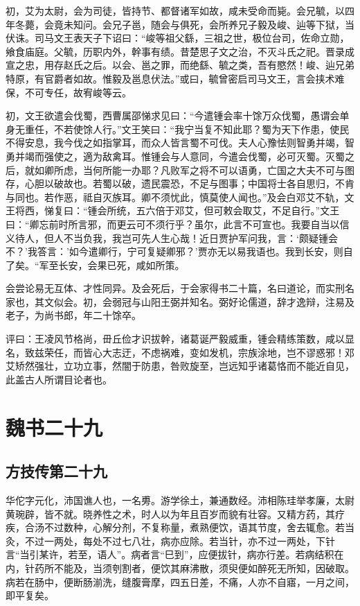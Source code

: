 \documentclass[12pt,UTF8]{ctexbook}
\begin{document}
初，艾为太尉，会为司徒，皆持节、都督诸军如故，咸未受命而毙。会兄毓，以四年冬薨，会竟未知问。会兄子邕，随会与俱死，会所养兄子毅及峻、辿等下狱，当伏诛。司马文王表天子下诏曰：“峻等祖父繇，三祖之世，极位台司，佐命立勋，飨食庙庭。父毓，历职内外，幹事有绩。昔楚思子文之治，不灭斗氏之祀。晋录成宣之忠，用存赵氏之后。以会、邕之罪，而绝繇、毓之类，吾有愍然！峻、辿兄弟特原，有官爵者如故。惟毅及邕息伏法。”或曰，毓曾密启司马文王，言会挟术难保，不可专任，故宥峻等云。

初，文王欲遣会伐蜀，西曹属邵悌求见曰：“今遣锺会率十馀万众伐蜀，愚谓会单身无重任，不若使馀人行。”文王笑曰：“我宁当复不知此耶？蜀为天下作患，使民不得安息，我今伐之如指掌耳，而众人皆言蜀不可伐。夫人心豫怯则智勇并竭，智勇并竭而强使之，適为敌禽耳。惟锺会与人意同，今遣会伐蜀，必可灭蜀。灭蜀之后，就如卿所虑，当何所能一办耶？凡败军之将不可以语勇，亡国之大夫不可与图存，心胆以破故也。若蜀以破，遗民震恐，不足与图事；中国将士各自思归，不肯与同也。若作恶，祗自灭族耳。卿不须忧此，慎莫使人闻也。”及会白邓艾不轨，文王将西，悌复曰：“锺会所统，五六倍于邓艾，但可敕会取艾，不足自行。”文王曰：“卿忘前时所言邪，而更云可不须行乎？虽尔，此言不可宣也。我要自当以信义待人，但人不当负我，我岂可先人生心哉！近日贾护军问我，言：‘颇疑锺会不？’我答言：'如今遣卿行，宁可复疑卿邪？'贾亦无以易我语也。我到长安，则自了矣。“军至长安，会果已死，咸如所策。

会尝论易无互体、才性同异。及会死后，于会家得书二十篇，名曰道论，而实刑名家也，其文似会。初，会弱冠与山阳王弼并知名。弼好论儒道，辞才逸辩，注易及老子，为尚书郎，年二十馀卒。

评曰：王凌风节格尚，毌丘俭才识拔幹，诸葛诞严毅威重，锺会精练策数，咸以显名，致兹荣任，而皆心大志迂，不虑祸难，变如发机，宗族涂地，岂不谬惑邪！邓艾矫然强壮，立功立事，然闇于防患，咎败旋至，岂远知乎诸葛恪而不能近自见，此盖古人所谓目论者也。

\part{魏书二十九}
\chapter{方技传第二十九}

华佗字元化，沛国谯人也，一名旉。游学徐土，兼通数经。沛相陈珪举孝廉，太尉黄琬辟，皆不就。晓养性之术，时人以为年且百岁而貌有壮容。又精方药，其疗疾，合汤不过数种，心解分剂，不复称量，煮熟便饮，语其节度，舍去辄愈。若当灸，不过一两处，每处不过七八壮，病亦应除。若当针，亦不过一两处，下针言“当引某许，若至，语人”。病者言“巳到”，应便拔针，病亦行差。若病结积在内，针药所不能及，当须刳割者，便饮其麻沸散，须臾便如醉死无所知，因破取。病若在肠中，便断肠湔洗，缝腹膏摩，四五日差，不痛，人亦不自寤，一月之间，即平复矣。
\end{document}

